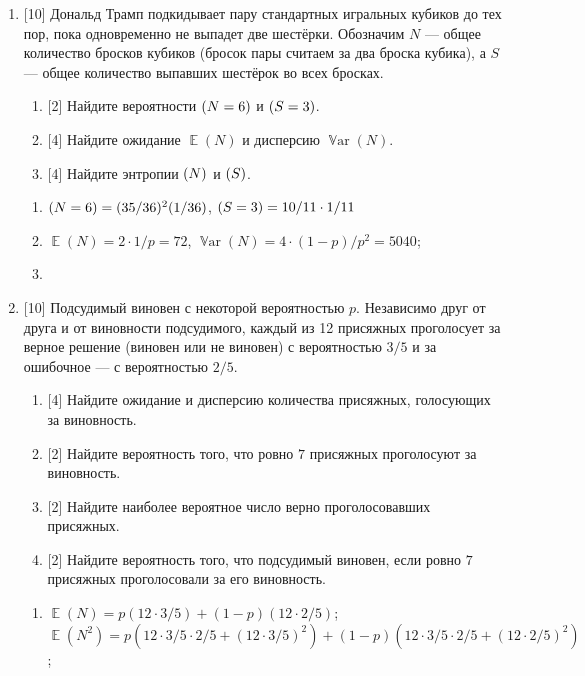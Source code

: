 \documentclass[12pt]{article}
\DeclareMathOperator{\Var}{\mathbb{V}ar}
\let\P\relax
\DeclareMathOperator{\P}{\mathbb{P}}
\let\H\relax
\DeclareMathOperator{\H}{\mathbb{H}}
\DeclareMathOperator{\E}{\mathbb{E}}
\begin{document}
\begin{enumerate}
    \item {[10]} Дональд Трамп подкидывает пару стандартных игральных кубиков до тех пор, пока одновременно не выпадет две шестёрки.
    Обозначим $N$ — общее количество бросков кубиков (бросок пары считаем за два броска кубика), а $S$ — общее количество выпавших шестёрок во всех бросках. 
    \begin{enumerate}
        \item {[2]} Найдите вероятности $\P(N = 6)$ и $\P(S = 3)$.
        \item {[4]} Найдите ожидание $\E(N)$ и дисперсию $\Var(N)$.
        \item {[4]} Найдите энтропии $\H(N)$ и $\H(S)$.
    \end{enumerate}

    \begin{enumerate}
        \item $\P(N = 6) = (35/36)^2 (1/36)$, $\P(S = 3) = 10/11 \cdot 1/11$ 
        \item $\E(N) = 2\cdot 1/p = 72$, $\Var(N) = 4 \cdot (1 - p)/p^2 = 5040$;
        \item 
    \end{enumerate}
    
    

    \item {[10]} Подсудимый виновен с некоторой вероятностью $p$.
    Независимо друг от друга и от виновности подсудимого, каждый из 12 присяжных проголосует за верное решение (виновен или не виновен) с вероятностью $3/5$
    и за ошибочное — с вероятностью $2/5$.
    \begin{enumerate}
        \item {[4]} Найдите ожидание и дисперсию количества присяжных, голосующих за виновность. 
        \item {[2]} Найдите вероятность того, что ровно $7$ присяжных проголосуют за виновность. 
        \item {[2]} Найдите наиболее вероятное число верно проголосовавших присяжных.
        \item {[2]} Найдите вероятность того, что подсудимый виновен, если ровно $7$ присяжных проголосовали за его виновность. 
    \end{enumerate}

    \begin{enumerate}
        \item     $\E(N) = p (12 \cdot 3/5) + (1 - p)(12 \cdot 2/5)$;
        $\E(N^2) = p(12 \cdot 3/5 \cdot 2/5 + (12 \cdot 3/5)^2) + (1-p) (12 \cdot 3/5 \cdot 2/5 + (12 \cdot 2/5)^2)$;


\end{enumerate}
\end{enumerate}
\end{document}
